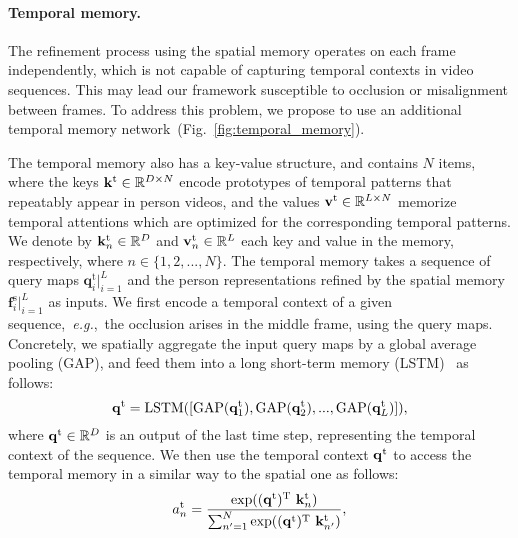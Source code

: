 \documentclass[10pt,twocolumn,letterpaper]{article}
\begin{document}
		\vspace{-0.4cm}
		\paragraph{Temporal memory.} \label{subsubsec:temporal_memory}
		
			The refinement process using the spatial memory operates on each frame independently, which is not capable of capturing temporal contexts in video sequences. This may lead our framework susceptible to occlusion or misalignment between frames. To address this problem, we propose to use an additional temporal memory network~(Fig.~\ref{fig:temporal_memory}).
			
			The temporal memory also has a key-value structure, and contains $N$ items, where the keys $\mathbf{k}^{\text t} \in \mathbb{R}^{D \times N}$ encode prototypes of temporal patterns that repeatably appear in person videos, and the values $\mathbf{v}^{\text t} \in \mathbb{R}^{L \times N}$ memorize temporal attentions which are optimized for the corresponding temporal patterns. We denote by $\mathbf{k}^{\text t}_n \in \mathbb{R}^{D}$ and $\mathbf{v}^{\text t}_n \in \mathbb{R}^{L}$ each key and value in the memory, respectively, where $n \in \{ 1, 2, ... , N\} $. The temporal memory takes a sequence of query maps $\mathbf{q}^\text{t}_i |_{i=1}^L$ and the person representations refined by the spatial memory $\mathbf{f}^\text{s}_i |_{i=1}^L$ as inputs. We first encode a temporal context of a given sequence,~\emph{e.g.},~the occlusion arises in the middle frame, using the query maps. Concretely, we spatially aggregate the input query maps by a global average pooling (GAP), and feed them into a long short-term memory (LSTM)~\cite{hochreiter1997long} as follows:
					\begin{equation}
						\mathbf{q}^{\text t} = \text{LSTM}([\text{GAP}(\mathbf{q}^{\text t}_{1}), \text{GAP}(\mathbf{q}^{\text t}_{2}), ..., \text{GAP}(\mathbf{q}^{\text t}_{L})]),
					\end{equation}
			where $\mathbf{q}^{\text t} \in \mathbb{R}^{D}$ is an output of the last time step, representing the temporal context of the sequence. We then use the temporal context $\mathbf{q}^{\text t}$ to access the temporal memory in a similar way to the spatial one as follows:
					\begin{equation}
						a^{\text t}_{n} = \frac{\exp((\mathbf{q}^{\text t})^{\text T}\ \mathbf{k}^{\text t}_n)}{\sum_{n^\prime=1}^{N} \exp((\mathbf{q}^{\text t})^{\text T}\ \mathbf{k}^{\text t}_{n^\prime})},
					\label{eq:a_t}
					\end{equation}
\end{document}
